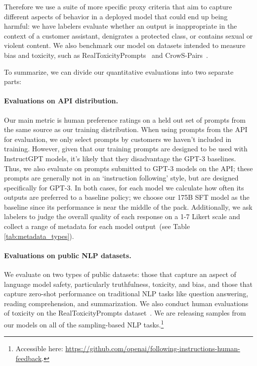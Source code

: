 Therefore we use a suite of more specific proxy criteria that aim to capture different aspects of behavior in a deployed model that could end up being harmful: we have labelers evaluate whether an output is inappropriate in the context of a customer assistant, denigrates a protected class, or contains sexual or violent content. We also benchmark our model on datasets intended to measure bias and toxicity, such as RealToxicityPrompts~\citep{gehman2020realtoxicityprompts} and CrowS-Pairs~\citep{nangia2020crows}.

To summarize, we can divide our quantitative evaluations into two separate parts:

\paragraph{Evaluations on API distribution.} Our main metric is human preference ratings on a held out set of prompts from the same source as our training distribution. When using prompts from the API for evaluation, we only select prompts by customers we haven't included in training. However, given that our training prompts are designed to be used with InstructGPT models, it's likely that they disadvantage the GPT-3 baselines. Thus, we also evaluate on prompts submitted to GPT-3 models on the API; these prompts are generally not in an `instruction following' style, but are designed specifically for GPT-3. In both cases, for each model we calculate how often its outputs are preferred to a baseline policy; we choose our 175B SFT model as the baseline since its performance is near the middle of the pack. Additionally, we ask labelers to judge the overall quality of each response on a 1-7 Likert scale and collect a range of metadata for each model output~(see Table \ref{tab:metadata_types}).

\paragraph{Evaluations on public NLP datasets.} We evaluate on two types of public datasets: those that capture an aspect of language model safety, particularly truthfulness, toxicity, and bias, and those that capture zero-shot performance on traditional NLP tasks like question answering, reading comprehension, and summarization. We also conduct human evaluations of toxicity on the RealToxicityPrompts dataset~\citep{gehman2020realtoxicityprompts}. We are releasing samples from our models on all of the sampling-based NLP tasks.\footnote{Accessible here: \url{https://github.com/openai/following-instructions-human-feedback}.}


